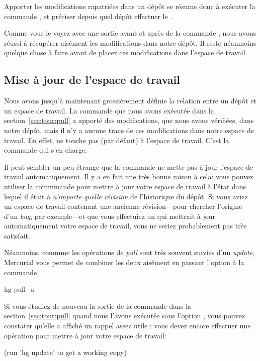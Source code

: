 Apporter les modifications rapatriées dans un dépôt se résume donc
à exécuter la commande , et préciser depuis quel dépôt 
effectuer le .

Comme vous le voyez avec une sortie avant et après de la commande
, nous avons réussi à récupérer aisément les modifications
dans notre dépôt. Il reste néanmoins quelque chose à faire avant de
placer ces modifications dans l'espace de travail.

\subsection{Mise à jour de l'espace de travail}

Nous avons jusqu'à maintenant grossièrement définie la relation 
entre un dépôt et un espace de travail. La commande  que
nous avons exécutée dans la section~\ref{sec:tour:pull} a apporté
des modifications, que nous avons vérifiées, dans notre dépôt, mais
il n'y a aucune trace de ces modifications dans notre espace de travail.
En effet,  ne touche pas (par défaut) à l'espace de 
travail. C'est la commande  qui s'en charge.

Il peut sembler un peu étrange que la commande  ne mette
pas à jour l'espace de travail automatiquement. Il y a en fait une
très bonne raison à cela: vous pouvez utiliser la commmande 
 pour mettre à jour votre espace de travail à l'état
dans lequel il était à \emph{n'importe quelle révision} de l'historique
du dépôt. Si vous aviez un espace de travail contenant une ancienne
révision---pour chercher l'origine d'un \textit{bug}, par exemple---et
que vous effectuiez un  qui mettrait à jour automatiquement
votre espace de travail, vous ne seriez probablement pas très satisfait.

Néanmoins, commme les opérations de \textit{pull} sont très souvent
suivies d'un \textit{update}, Mercurial vous permet de combiner les
deux aisément en passant l'option  à la commande
\begin{codesample2}
  hg pull -u
\end{codesample2}

Si vous étudiez de nouveau la sortie de la commande  dans
la section~\ref{sec:tour:pull} quand nous l'avons exécutée sans l'option
, vous pouvez constater qu'elle a affiché un rappel assez
utile : vous devez encore effectuer une opération pour mettre à jour
votre espace de travail:
\begin{codesample2}
  (run 'hg update' to get a working copy)
\end{codesample2}

